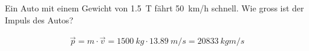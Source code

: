 
\begin{aufgabe}
	Ein Auto mit einem Gewicht von \SI{1.5}{T} fährt \SI{50}{km/h} schnell.
	Wie gross ist der Impuls des Autos?
	\begin{loesung}
		\begin{eqnarray*}
			\vec{p} = m\cdot\vec{v}=\SI{1500}{kg}\cdot\SI{13.89}{m/s}=\SI{20833}{kg m/s}
		\end{eqnarray*}
	\end{loesung}
\end{aufgabe}
